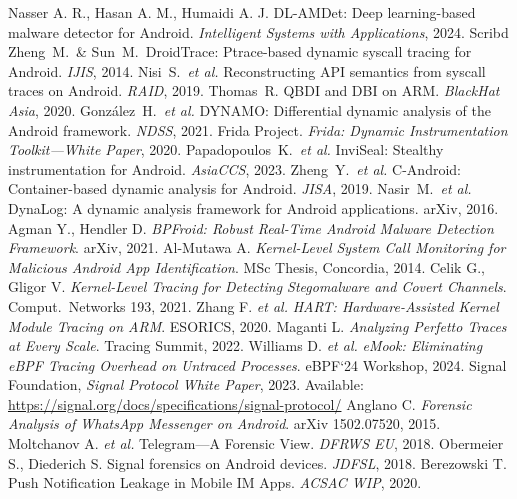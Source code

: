 \documentclass[a4paper,12pt]{report}
\begin{document}
\begin{thebibliography}{99}
    Nasser A. R., Hasan A. M., Humaidi A. J. DL-AMDet: Deep learning-based malware detector for Android. \textit{Intelligent Systems with Applications}, 2024. Scribd
     Zheng~M.\ \& Sun~M.\ DroidTrace: Ptrace-based dynamic syscall tracing for Android. \textit{IJIS}, 2014.
     Nisi~S.\ \emph{et al.} Reconstructing API semantics from syscall traces on Android. \textit{RAID}, 2019.
     Thomas~R. QBDI and DBI on ARM. \textit{BlackHat Asia}, 2020.
     González~H.\ \emph{et al.} DYNAMO: Differential dynamic analysis of the Android framework. \textit{NDSS}, 2021.
     Frida Project. \textit{Frida: Dynamic Instrumentation Toolkit—White Paper}, 2020.
     Papadopoulos~K.\ \emph{et al.} InviSeal: Stealthy instrumentation for Android. \textit{AsiaCCS}, 2023.
     Zheng~Y.\ \emph{et al.} C-Android: Container-based dynamic analysis for Android. \textit{JISA}, 2019.
     Nasir~M.\ \emph{et al.} DynaLog: A dynamic analysis framework for Android applications. arXiv, 2016.
     Agman Y., Hendler D. \emph{BPFroid: Robust Real-Time Android Malware Detection Framework}. arXiv, 2021.
     Al-Mutawa A. \emph{Kernel-Level System Call Monitoring for Malicious Android App Identification}. MSc Thesis, Concordia, 2014.
     Celik G., Gligor V. \emph{Kernel-Level Tracing for Detecting Stegomalware and Covert Channels}. Comput.\ Networks 193, 2021.
     Zhang F. \emph{et al.} \emph{HART: Hardware-Assisted Kernel Module Tracing on ARM}. ESORICS, 2020.
     Maganti L. \emph{Analyzing Perfetto Traces at Every Scale}. Tracing Summit, 2022.
     Williams D. \emph{et al.} \emph{eMook: Eliminating eBPF Tracing Overhead on Untraced Processes}. eBPF‘24 Workshop, 2024.
     Signal Foundation, \textit{Signal Protocol White Paper}, 2023. Available: \url{https://signal.org/docs/specifications/signal-protocol/}
     Anglano C. \textit{Forensic Analysis of WhatsApp Messenger on Android}. arXiv 1502.07520, 2015.
 Moltchanov A. \emph{et al.} Telegram—A Forensic View. \textit{DFRWS EU}, 2018.
 Obermeier S., Diederich S. Signal forensics on Android devices. \textit{JDFSL}, 2018.
 Berezowski T. Push Notification Leakage in Mobile IM Apps. \textit{ACSAC WIP}, 2020.

\end{thebibliography}
\end{document}
